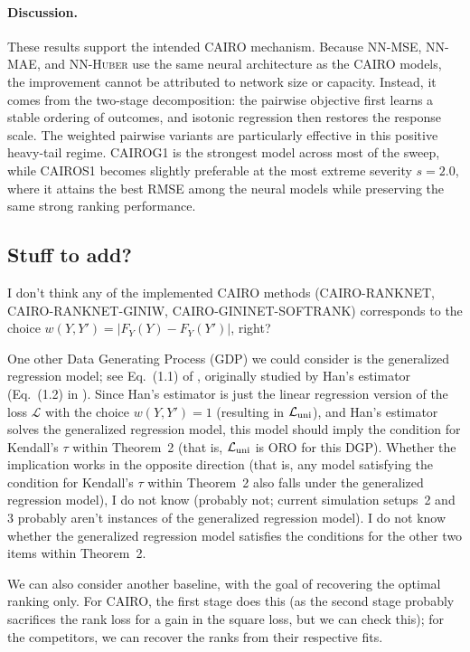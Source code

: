 \documentclass[11pt]{article}
\theoremstyle{plain}
\theoremstyle{plain}
\theoremstyle{plain}
\theoremstyle{plain}
\theoremstyle{plain}
\theoremstyle{plain}
\theoremstyle{plain}
\begin{document}
\paragraph{Discussion.}
These results support the intended CAIRO mechanism. Because \textsc{NN-MSE}, \textsc{NN-MAE}, and \textsc{NN-Huber} use the same neural architecture as the CAIRO models, the improvement cannot be attributed to network size or capacity. Instead, it comes from the two-stage decomposition: the pairwise objective first learns a stable ordering of outcomes, and isotonic regression then restores the response scale. The weighted pairwise variants are particularly effective in this positive heavy-tail regime. \textsc{CAIROG1} is the strongest model across most of the sweep, while \textsc{CAIROS1} becomes slightly preferable at the most extreme severity \(s=2.0\), where it attains the best RMSE among the neural models while preserving the same strong ranking performance.


\subsection{Stuff to add?}

I don't think any of the implemented CAIRO methods (CAIRO-RANKNET, CAIRO-RANKNET-GINIW, CAIRO-GININET-SOFTRANK) corresponds to the choice $w(Y,Y') = |F_Y(Y) - F_Y(Y')|$, right?

One other Data Generating Process (GDP) we could consider is the generalized regression model; see Eq.~(1.1) of \cite{shin2021exact}, originally studied by Han's estimator (Eq.~(1.2) in \cite{shin2021exact}).  Since Han's estimator is just the linear regression version of the loss $\mathcal{L}$ with the choice $w(Y,Y') = 1$ (resulting in $\mathcal{L}_{\textup{uni}}$), and Han's estimator solves the generalized regression model, this model should imply the condition for Kendall's $\tau$ within Theorem~2 (that is, $\mathcal{L}_{\textup{uni}}$ is ORO for this DGP).  Whether the implication works in the opposite direction (that is, any model satisfying the condition for Kendall's $\tau$ within Theorem~2 also falls under the generalized regression model), I do not know (probably not; current simulation setups~2 and 3 probably aren't instances of the generalized regression model).  I do not know whether the generalized regression model satisfies the conditions for the other two items within Theorem~2.

We can also consider another baseline, with the goal of recovering the optimal ranking only.  For CAIRO, the first stage does this (as the second stage probably sacrifices the rank loss for a gain in the square loss, but we can check this); for the competitors, we can recover the ranks from their respective fits.
\end{document}
